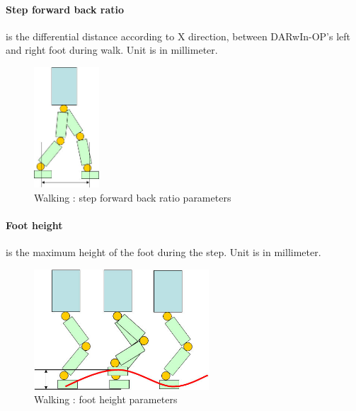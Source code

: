 \documentclass[a4paper, 12pt]{article}  		%
\begin{document}
\paragraph*{Step forward back ratio}
is the differential distance according to X direction, between DARwIn-OP's left and right foot during walk. Unit is in millimeter.
\begin{figure}[H]
\begin{center}
\includegraphics[height=4.5cm]{step_forward_back_ratio.jpg}
\caption{Walking : step forward back ratio parameters}
\label{step_forward_back_ratio}
\end{center}
\end{figure}

\paragraph*{Foot height}
is the maximum height of the foot during the step. Unit is in millimeter.
\begin{figure}[H]
\begin{center}
\includegraphics[height=4.5cm]{foot_height.jpg}
\caption{Walking : foot height parameters}
\label{foot_height}
\end{center}
\end{figure}
\end{document}
